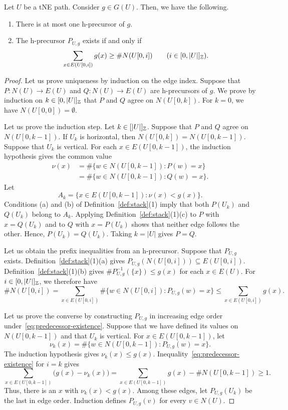 \begin{lemma}\label{lem:predecessor-uniqueness}\label{lem:predecessor-existence}
Let $U$ be a tNE path.
Consider $g\in G(U)$.
Then, we have the following.

\begin{enumerate}
\item\label{c:predecessor-uniqueness} There is at most one h-precursor of $g$.
\item\label{c:predecessor-existence} The h-precursor $P_{U,g}$ exists if and only if
\begin{equation}\label{eq:predecessor-existence}
 \sum_{x\in E(U[0,i])}g(x)\ge\#N(U[0,i])
 \qquad(i\in[0,|U|]_{\mathbb Z}).
\end{equation}
\end{enumerate}
\end{lemma}
\begin{proof}
 Let us prove uniqueness by induction on the edge index. Suppose that
$P\colon N(U)\to E(U)$ and $Q\colon N(U)\to E(U)$ are h-precursors of $g$.
We prove by induction on $k\in[0,|U|]_{\mathbb Z}$ that $P$ and $Q$
agree on $N(U[0,k])$.
For $k=0$, we have $N(U[0,0])=\emptyset$.

Let us prove the induction step.
Let $k\in[|U|]_{\mathbb Z}$. Suppose that $P$ and $Q$ agree on
$N(U[0,k-1])$. If $U_k$ is horizontal, then $N(U[0,k])=N(U[0,k-1])$.
Suppose that $U_k$ is vertical. For each $x\in E(U[0,k-1])$,
the induction hypothesis gives the common value
\begin{align*}
 \nu(x)&=\#\{w\in N(U[0,k-1]):P(w)=x\}\\
     &=\#\{w\in N(U[0,k-1]):Q(w)=x\}.
\end{align*}
Let
\[
 A_k=\{x\in E(U[0,k-1]):\nu(x)<g(x)\}.
\]
Conditions (a) and (b) of Definition~\ref{def:stack}(1) imply
that both $P(U_k)$ and $Q(U_k)$ belong to $A_k$.
Applying Definition~\ref{def:stack}(1)(c) to $P$ with $x=Q(U_k)$ and to $Q$ with
$x=P(U_k)$ shows that neither edge follows the other.
Hence, $P(U_k)=Q(U_k)$. Taking $k=|U|$ gives $P=Q$.

 Let us obtain the prefix inequalities from an h-precursor. Suppose that $P_{U,g}$ exists. Definition~\ref{def:stack}(1)(a) gives
$P_{U,g}(N(U[0,i]))\subseteq E(U[0,i])$. Definition~\ref{def:stack}(1)(b) gives
$\#P_{U,g}^{-1}(\{x\})\le g(x)$ for each $x\in E(U)$.
For $i\in[0,|U|]_{\mathbb Z}$, we therefore have
\[
 \#N(U[0,i])
 =\sum_{x\in E(U[0,i])}\#\{w\in N(U[0,i]):P_{U,g}(w)=x\}
 \le\sum_{x\in E(U[0,i])}g(x).
\]

Let us prove the converse by constructing $P_{U,g}$ in increasing edge order under~\eqref{eq:predecessor-existence}.
Suppose that we have defined its values on $N(U[0,k-1])$ and that
$U_k$ is vertical. For $x\in E(U[0,k-1])$, let
\[
 \nu_k(x)=\#\{w\in N(U[0,k-1]):P_{U,g}(w)=x\}.
\]
The induction hypothesis gives $\nu_k(x)\le g(x)$. Inequality~\eqref{eq:predecessor-existence} for $i=k$ gives
\[
 \sum_{x\in E(U[0,k-1])}\bigl(g(x)-\nu_k(x)\bigr)
 =\sum_{x\in E(U[0,k-1])}g(x)-\#N(U[0,k-1])\ge1.
\]
Thus, there is an $x$ with $\nu_k(x)<g(x)$. Among these edges, let
$P_{U,g}(U_k)$ be the last in edge order.
Induction defines $P_{U,g}(v)$ for every $v\in N(U)$.
\end{proof}

